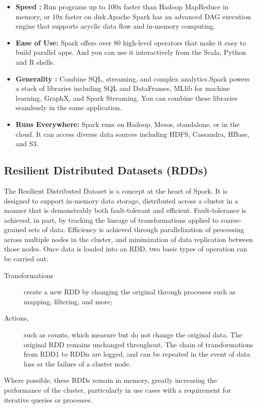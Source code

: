 \documentclass[twoside]{article}
\begin{document}
\begin{itemize}
\item \textbf{Speed :} Run programs up to 100x faster than Hadoop MapReduce in memory, or 10x faster on disk.Apache Spark has an advanced DAG execution engine that supports acyclic data flow and in-memory computing.
\item \textbf{Ease of Use:} Spark offers over 80 high-level operators that make it easy to build parallel apps. And you can use it interactively from the Scala, Python and R shells.
\item \textbf{Generality :} Combine SQL, streaming, and complex analytics.Spark powers a stack of libraries including SQL and DataFrames, MLlib for machine learning, GraphX, and Spark Streaming. You can combine these libraries seamlessly in the same application.
\item \textbf{Runs Everywhere:} Spark runs on Hadoop, Mesos, standalone, or in the cloud. It can access diverse data sources including HDFS, Cassandra, HBase, and S3.
\end{itemize}

\subsection{Resilient Distributed Datasets (RDDs)}
The Resilient Distributed Dataset is a concept at the heart of Spark. It is designed to support in-memory data storage, distributed across a cluster in a manner that is demonstrably both fault-tolerant and efficient. Fault-tolerance is achieved, in part, by tracking the lineage of transformations applied to coarse-grained sets of data. Efficiency is achieved through parallelization of processing across multiple nodes in the cluster, and minimization of data replication between those nodes. Once data is loaded into an RDD, two basic types of operation can be carried out:
\begin{description}
\item[Transformations] create a new RDD by changing the original through processes such as mapping, filtering, and more;
\item[Actions,] such as counts, which measure but do not change the original data.
The original RDD remains unchanged throughout. The chain of transformations from RDD1 to RDDn are logged, and can be repeated in the event of data loss or the failure of a cluster node.
\end{description}
Where possible, these RDDs remain in memory, greatly increasing the performance of the cluster, particularly in use cases with a requirement for iterative queries or processes.
\end{document}
